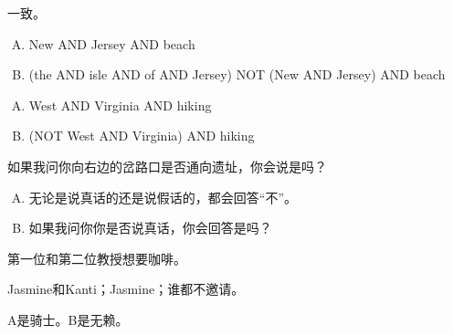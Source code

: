 {{\begin{practices}
            一致。
        \end{practices}

        \begin{practices}
            \begin{enumerate}[A.]
                \item New AND Jersey AND beach
                \item (the AND isle AND of AND Jersey) NOT (New AND Jersey) AND beach
            \end{enumerate}
        \end{practices}

        \begin{practices}
            \begin{enumerate}[A.]
                \item West AND Virginia AND hiking
                \item (NOT West AND Virginia) AND hiking
            \end{enumerate}
        \end{practices}

        \begin{practices}
            如果我问你向右边的岔路口是否通向遗址，你会说是吗？
        \end{practices}

        \begin{practices}
            \begin{enumerate}[A.]
                \item 无论是说真话的还是说假话的，都会回答``不''。
                \item 如果我问你你是否说真话，你会回答是吗？
            \end{enumerate}
        \end{practices}

        \begin{practices}
            第一位和第二位教授想要咖啡。
        \end{practices}

        \begin{practices}
            Jasmine和Kanti；Jasmine；谁都不邀请。
        \end{practices}

        \begin{practices}
            A是骑士。B是无赖。


\end{practices}}}
